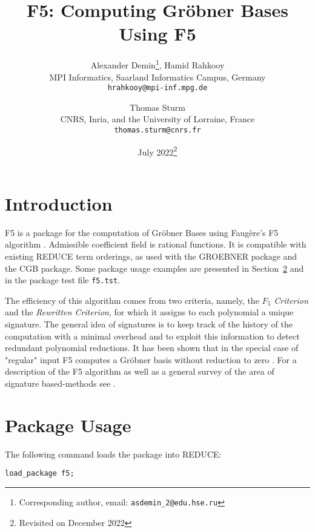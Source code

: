 \documentclass{article}
\newcommand{\grobner}{Gr\"obner}
\newcommand{\faugere}{Faug\`ere}
\newcommand{\code}[1]{\texttt{#1}}
\begin{document}
\title{F5: Computing Gröbner Bases Using F5}

\author{Alexander Demin\footnote{Corresponding author, email: \texttt{asdemin\_2@edu.hse.ru}}, Hamid Rahkooy\\
  MPI Informatics, Saarland Informatics Campus, Germany\\
  \texttt{hrahkooy@mpi-inf.mpg.de}
  \and
  Thomas Sturm\\
  CNRS, Inria, and the University of Lorraine, France\\
  \texttt{thomas.sturm@cnrs.fr}
}

\date{July 2022\footnote{Revisited on December 2022}}

\maketitle

\section{Introduction}

F5 is a package for the computation of \grobner{} Bases using \faugere{}'s F5 algorithm \cite{f5}.
Admissible coefficient field is rational functions. It is compatible with existing REDUCE term
orderings, as used with the GROEBNER package and the CGB package. Some package usage examples are
presented in Section~\ref{SE:usage} and in the package test file
\code{f5.tst}.

The efficiency of this algorithm comes from two criteria, namely, the \emph{$F_5$ Criterion} and the
\emph{Rewritten Criterion}, for which it assigns to each polynomial a unique signature. The general
idea of signatures is to keep track of the history of the computation with a minimal overhead and to
exploit this information to detect redundant polynomial reductions. It has been shown that in the
special case of "regular" input F5 computes a \grobner{} basis without reduction to zero \cite{f5}.
For a description of the F5 algorithm as well as a general survey of the area of signature
based-methods see \cite{survey}.

\section{Package Usage}\label{SE:usage}

The following command loads the package into REDUCE:
%
\begin{center}
    \code{load\_package f5;}
\end{center}
\end{document}
